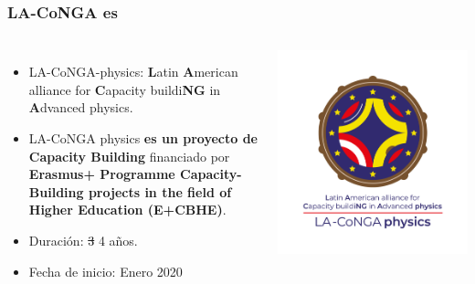 \begin{frame}[fragile]
\frametitle{LA-CoNGA es}
\begin{columns}[c] %

\begin{itemize}
\item LA-CoNGA-physics: {\bf L}atin {\bf A}merican alliance for {\bf C}apacity buildi{\bf NG} in {\bf A}dvanced physics.
\item LA-CoNGA physics {\bf \color{LCredInst} es un proyecto de Capacity Building} financiado por {\bf \color{LCblueInst} Erasmus+ Programme Capacity-Building projects in the field of Higher Education (E+CBHE)}.
\item Duración: \st{3} 4 años.
\item Fecha de inicio: Enero 2020
\end{itemize}


\begin{center}
\includegraphics[scale=0.07]{imagenes/imagotipo-vertical-RGB-grande.png}
\end{center}

\end{columns}
\end{frame}

